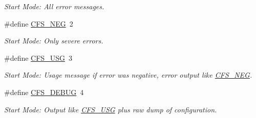 \begin{CompactItemize}
\begin{CompactList}\small\item\em Start Mode: All error messages. \item\end{CompactList}\item 
\hypertarget{group__cflib__core_g5663cfeeda02fa9e2fee53b418c5045b}{
\#define \hyperlink{group__cflib__core_g5663cfeeda02fa9e2fee53b418c5045b}{CFS\_\-NEG}~2}
\label{group__cflib__core_g5663cfeeda02fa9e2fee53b418c5045b}

\begin{CompactList}\small\item\em Start Mode: Only severe errors. \item\end{CompactList}\item 
\hypertarget{group__cflib__core_g3f535ad957f1836dea64deae798324a5}{
\#define \hyperlink{group__cflib__core_g3f535ad957f1836dea64deae798324a5}{CFS\_\-USG}~3}
\label{group__cflib__core_g3f535ad957f1836dea64deae798324a5}

\begin{CompactList}\small\item\em Start Mode: Usage message if error was negative, error output like \hyperlink{group__cflib__core_g5663cfeeda02fa9e2fee53b418c5045b}{CFS\_\-NEG}. \item\end{CompactList}\item 
\hypertarget{group__cflib__core_g870957fdc2246ddc767747f8dd645bdf}{
\#define \hyperlink{group__cflib__core_g870957fdc2246ddc767747f8dd645bdf}{CFS\_\-DEBUG}~4}
\label{group__cflib__core_g870957fdc2246ddc767747f8dd645bdf}

\begin{CompactList}\small\item\em Start Mode: Output like \hyperlink{group__cflib__core_g3f535ad957f1836dea64deae798324a5}{CFS\_\-USG} plus raw dump of configuration. \item\end{CompactList}\end{CompactItemize}
